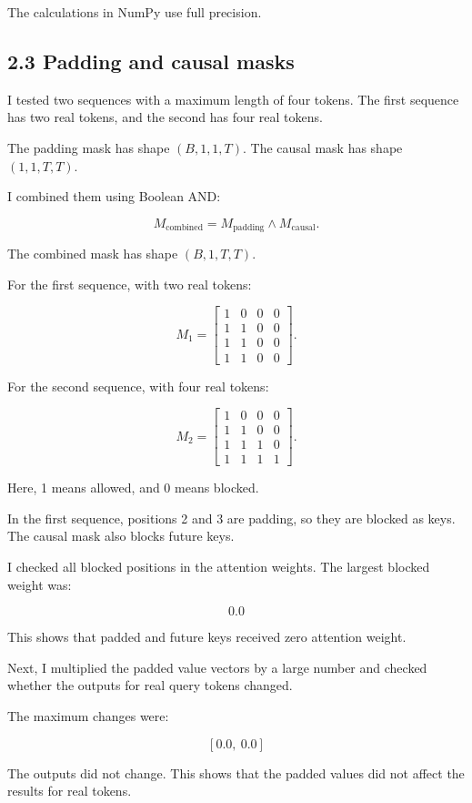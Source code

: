 \documentclass[11pt]{article}
\begin{document}
The calculations in NumPy use full precision.
\subsection*{2.3 Padding and causal masks}
I tested two sequences with a maximum length
of four tokens. The first sequence has two real
tokens, and the second has four real tokens.

The padding mask has shape $(B,1,1,T)$.
The causal mask has shape $(1,1,T,T)$.

I combined them using Boolean AND:

\[
M_{\mathrm{combined}}
=
M_{\mathrm{padding}}
\land M_{\mathrm{causal}}.
\]

The combined mask has shape $(B,1,T,T)$.

For the first sequence, with two real tokens:

\[
M_1=
\begin{bmatrix}
1&0&0&0\\
1&1&0&0\\
1&1&0&0\\
1&1&0&0
\end{bmatrix}.
\]

For the second sequence, with four real tokens:

\[
M_2=
\begin{bmatrix}
1&0&0&0\\
1&1&0&0\\
1&1&1&0\\
1&1&1&1
\end{bmatrix}.
\]

Here, 1 means allowed, and 0 means blocked.

In the first sequence, positions 2 and 3 are
padding, so they are blocked as keys.
The causal mask also blocks future keys.

I checked all blocked positions in the attention
weights. The largest blocked weight was:

\[
\boxed{0.0}
\]

This shows that padded and future keys received
zero attention weight.

Next, I multiplied the padded value vectors by
a large number and checked whether the outputs
for real query tokens changed.

The maximum changes were:

\[
\boxed{[0.0,\ 0.0]}
\]

The outputs did not change. This shows that
the padded values did not affect the results
for real tokens.
\end{document}

